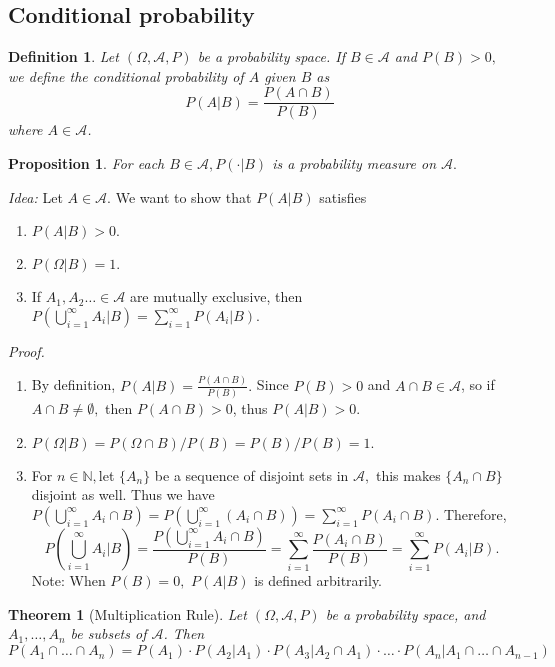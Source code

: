 \documentclass[12pt]{report} \addtolength{\textheight}{2in}
\newtheorem{defn}{Definition}
\newtheorem{prop}{Proposition}
\newtheorem{thm}{Theorem}
\newcommand{\bigN}{\mathbb{N}}
\newcommand{\bigA}{\mathcal{A}}
\newcommand{\infU}{ \bigcup_{i=1}^{\infty}}
\newcommand{\probsp}{(\Omega, \bigA, P)}
\begin{document}
\subsection*{Conditional probability}
\begin{defn}
Let $\probsp$ be a probability space. If $B\in \bigA$ and $P(B) > 0,$ we define the \textit{conditional probability} of $A$ given $B$ as
\begin{displaymath}
P(A|B) =\frac{P(A\cap B)}{P(B)}
\end{displaymath}
where $A\in \bigA$.
\end{defn}
\newpage
\begin{prop}
For each $B \in \bigA, P(\cdot | B)$ is a probability measure on $\bigA.$ 
\end{prop}
\textit{Idea:} Let $A \in \bigA.$ We want to show that $P(A|B)$ satisfies
\begin{enumerate}[(1)]
\item $P(A|B) > 0.$
\item $P(\Omega|B)=1.$
\item If $A_1,A_2\dots \in \bigA$ are mutually exclusive, then $P(\infU A_i |B)=\sum_{i=1}^{\infty}P(A_i|B).$
\end{enumerate}
\textit{Proof.} 
\begin{enumerate}[(1)]
\item By definition, $P(A|B) =\frac{P(A\cap B)}{P(B)}.$ Since $P(B) > 0$ and $A\cap B \in \bigA$, so if $A \cap B \not=\emptyset,$ then $P(A\cap B) > 0$,  thus $P(A|B) > 0.$ 
\item $P(\Omega|B)=P(\Omega \cap B)/ P(B) = P(B)/P(B)=1.$
\item For $n\in\bigN,$let $\{A_n\}$ be a sequence of disjoint sets in $\bigA,$ this makes $\{A_n \cap B\}$ disjoint as well. Thus we have $P(\infU A_i \cap B)=P(\infU(A_i \cap B))=\sum_{i=1}^{\infty} P(A_i \cap B)$. Therefore, 
\begin{displaymath}
P(\infU A_i | B) =\frac{P(\infU A_i \cap B)}{P(B)}=\sum_{i=1}^{\infty} \frac{P(A_i \cap B)}{P(B)}=\sum_{i=1}^{\infty} P(A_i|B).
\end{displaymath}
Note: When $P(B)=0,$ $P(A|B)$ is defined arbitrarily.
\end{enumerate}
\begin{thm}[Multiplication Rule]
\item Let $\probsp$ be a probability space, and $A_1,\dots, A_n$ be subsets of $\bigA$. Then
\begin{displaymath}
P(A_1\cap\dots \cap A_n)= P(A_1)\cdot P(A_2|A_1)\cdot P(A_3|A_2\cap A_1)\cdot\dots\cdot P(A_n| A_1\cap\dots \cap A_{n-1})
\end{displaymath}
\end{thm}
\end{document}
